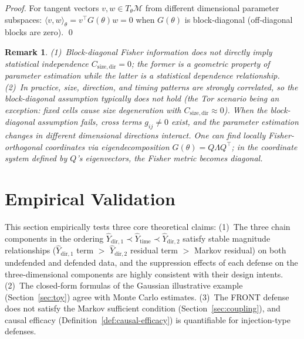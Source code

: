 \documentclass[lettersize,journal]{IEEEtran}
\newtheorem{remark}{Remark}
\begin{document}
\begin{proof}
For tangent vectors $v, w \in T_\theta\mathcal{M}$ from different
dimensional parameter subspaces:
$\langle v, w \rangle_\theta = v^\top G(\theta) w = 0$
when $G(\theta)$ is block-diagonal (off-diagonal blocks are zero). \qed
\end{proof}

\begin{remark}
(1)~Block-diagonal Fisher information does not directly imply statistical
independence $C_{\mathrm{size,dir}}=0$; the former is a geometric property
of parameter estimation while the latter is a statistical dependence
relationship.
(2)~In practice, size, direction, and timing patterns are strongly
correlated, so the block-diagonal assumption typically does not hold (the
Tor scenario being an exception: fixed cells cause size degeneration with
$C_{\mathrm{size,dir}}\approx 0$).
When the block-diagonal assumption fails, cross terms $g_{ij}\neq 0$ exist,
and the parameter estimation changes in different dimensional directions
interact.
One can find locally Fisher-orthogonal coordinates via eigendecomposition
$G(\theta) = Q\Lambda Q^\top$; in the coordinate system defined by $Q$'s
eigenvectors, the Fisher metric becomes diagonal.
\end{remark}

\section{Empirical Validation}\label{sec:empirical}

This section empirically tests three core theoretical claims:
(1)~The three chain components in the ordering
$\hat{Y}_{\mathrm{dir},1}\prec \hat{Y}_{\mathrm{time}}\prec \hat{Y}_{\mathrm{dir},2}$
satisfy stable magnitude relationships
($\hat{Y}_{\mathrm{dir},1}$ term $>$ $\hat{Y}_{\mathrm{dir},2}$
residual term $>$ Markov residual) on both undefended and defended data,
and the suppression effects of each defense on the three-dimensional
components are highly consistent with their design intents.
(2)~The closed-form formulas of the Gaussian illustrative example
(Section~\ref{sec:toy}) agree with Monte Carlo estimates.
(3)~The FRONT defense does not satisfy the Markov sufficient condition
(Section~\ref{sec:coupling}), and causal efficacy
(Definition~\ref{def:causal-efficacy}) is quantifiable for injection-type
defenses.
\end{document}
